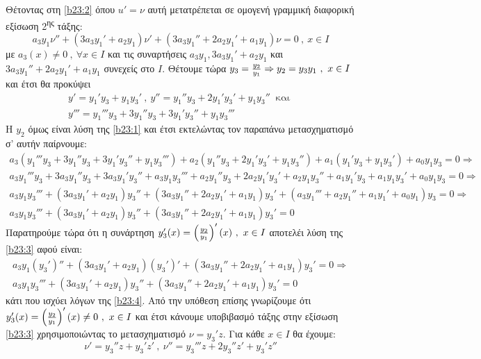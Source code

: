 \documentclass[a4paper,twoside,11pt]{book}
\DeclareRobustCommand{\frac}[3][0pt]{%
{\begingroup\hspace{#1}#2\hspace{#1}\endgroup\over\hspace{#1}#3\hspace{#1}}}
\newcommand{\tss}[1]{\textsuperscript{#1}}
\begin{document}
Θέτοντας στη \eqref{b23:2} όπου $ u'=\nu $ αυτή μετατρέπεται σε ομογενή γραμμική διαφορική εξίσωση 2\tss{ης} τάξης:
\begin{equation}\label{b23:3}
a_3y_1\nu''+\left( 3a_3y_1'+a_2y_1\right)\nu'+\left( 3a_3y_1''+2a_2y_1'+a_1y_1\right)\nu=0\ ,\ x\in I 
\end{equation}
με $ a_3(x)\neq0\ ,\ \forall x\in I $ και τις συναρτήσεις $ a_3y_1,3a_3y_1'+a_2y_1 $ και $ 3a_3y_1''+2a_2y_1'+a_1y_1 $ συνεχείς στο $ I $. Θέτουμε τώρα $ y_3=\frac{y_2}{y_1}\Rightarrow y_2=y_3y_1\ ,\ x\in I $ και έτσι θα προκύψει
\begin{gather*}
y'=y_1'y_3+y_1y_3'\ ,\ y''=y_1''y_3+2y_1'y_3'+y_1y_3''\ \textrm{ και }\\
y'''=y_1'''y_3+3y_1''y_3+3y_1'y_3''+y_1y_3'''
\end{gather*}
Η $ y_2 $ όμως είναι λύση της \eqref{b23:1} και έτσι εκτελώντας τον παραπάνω μετασχηματισμό σ' αυτήν παίρνουμε:
\begin{gather}
a_3\left( y_1'''y_3+3y_1''y_3+3y_1'y_3''+y_1y_3'''\right) +a_2\left( y_1''y_3+2y_1'y_3'+y_1y_3''\right) +a_1\left( y_1'y_3+y_1y_3'\right) +a_0y_1y_3=0\Rightarrow\nonumber\\
a_3y_1'''y_3+3a_3y_1''y_3+3a_3y_1'y_3''+a_3y_1y_3''' +a_2y_1''y_3+2a_2y_1'y_3'+a_2y_1y_3'' + a_1y_1'y_3+a_1y_1y_3' +a_0y_1y_3=0\Rightarrow\nonumber\\
a_3y_1y_3'''+\left( 3a_3y_1'+a_2y_1\right)y_3''+\left( 3a_3y_1''+2a_2y_1'+a_1y_1\right)y_3'+\left(a_3y_1'''+a_2y_1''+a_1y_1'+a_0y_1\right)y_3=0\Rightarrow\nonumber\\
a_3y_1y_3'''+\left( 3a_3y_1'+a_2y_1\right)y_3''+\left( 3a_3y_1''+2a_2y_1'+a_1y_1\right)y_3'=0\label{b23:4}
\end{gather}
Παρατηρούμε τώρα ότι η συνάρτηση $ y_3'(x)=\left(\frac{y_2}{y_1}\right)'(x)\ ,\ x\in I $ αποτελέι λύση της \eqref{b23:3} αφού είναι:
\begin{gather*}
a_3y_1(y_3')''+\left( 3a_3y_1'+a_2y_1\right)(y_3')'+\left( 3a_3y_1''+2a_2y_1'+a_1y_1\right)y_3'=0\Rightarrow\\
a_3y_1y_3'''+\left( 3a_3y_1'+a_2y_1\right)y_3''+\left( 3a_3y_1''+2a_2y_1'+a_1y_1\right)y_3'=0
\end{gather*}
κάτι που ισχύει λόγων της \eqref{b23:4}. Από την υπόθεση επίσης γνωρίζουμε ότι $ y_3'(x)=\left(\frac{y_2}{y_1}\right)'(x)\neq0\ ,\ x\in I $ και έτσι κάνουμε υποβιβασμό τάξης στην εξίσωση \eqref{b23:3} χρησιμοποιώντας το μετασχηματισμό $ \nu=y_3'z $. Για κάθε $ x\in I $ θα έχουμε:
\[ \nu'=y_3''z+y_3'z'\ ,\ \nu''=y_3'''z+2y_3''z'+y_3'z'' \]
\end{document}
